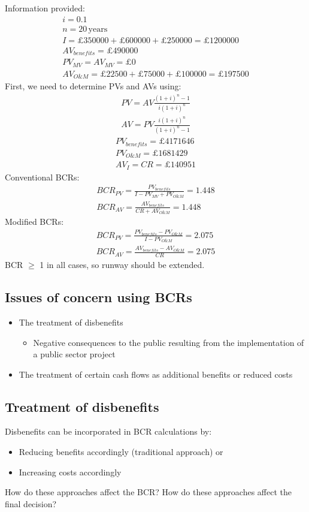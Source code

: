 \documentclass[class=report, crop=false, 12pt,a4paper]{standalone}
\begin{document}
Information provided:
\begin{gather}
	i = 0.1\\
	n = 20\, \textrm{years}\\
	I = £350000 + £600000 + £250000 = £1200000\\
	AV_{benefits} = £490000\\
	PV_{MV} = AV_{MV} = £0\\
	AV_{O\&M} = £22500 + £75000 + £100000 = £197500
\end{gather}
First, we need to determine PVs and AVs using:
\begin{gather}
	PV = AV\frac{\left(1+i\right)^n - 1}{i\left(1 + i\right)^n}\\
	AV = PV\frac{i\left(1+i\right)^n}{\left(1+i\right)^n - 1}
\end{gather}
\begin{gather}
	PV_{benefits} = £4171646\\
	PV_{O\&M} = £1681429\\
	AV_I = CR = £140951
\end{gather}
Conventional BCRs:
\begin{gather}
	BCR_{PV} = \frac{PV_{benefits}}{I - PV_{MV}+PV_{O\&M}} = 1.448\\
	BCR_{AV} = \frac{AV_{benefits}}{CR + AV_{O\&M}} = 1.448
\end{gather}
Modified BCRs:
\begin{gather}
	BCR_{PV} = \frac{PV_{benefits} - PV_{O\&M}}{I - PV_{O\&M}} = 2.075\\
	BCR_{AV} = \frac{AV_{benefits}- AV_{O\&M}}{CR} = 2.075
\end{gather}
BCR $\geq$ 1 in all cases, so runway should be extended.
\subsection{Issues of concern using BCRs}
\begin{itemize}
	\item The treatment of disbenefits
	\begin{itemize}
		\item Negative consequences to the public resulting from the implementation of a public sector project
	\end{itemize}
	\item The treatment of certain cash flows as additional benefits or reduced costs
\end{itemize}
\subsection{Treatment of disbenefits}
Disbenefits can be incorporated in BCR calculations by:
\begin{itemize}
	\item Reducing benefits accordingly (traditional approach) or
	\item Increasing costs accordingly
\end{itemize}
How do these approaches affect the BCR? How do these approaches affect the final decision? 
\end{document}
